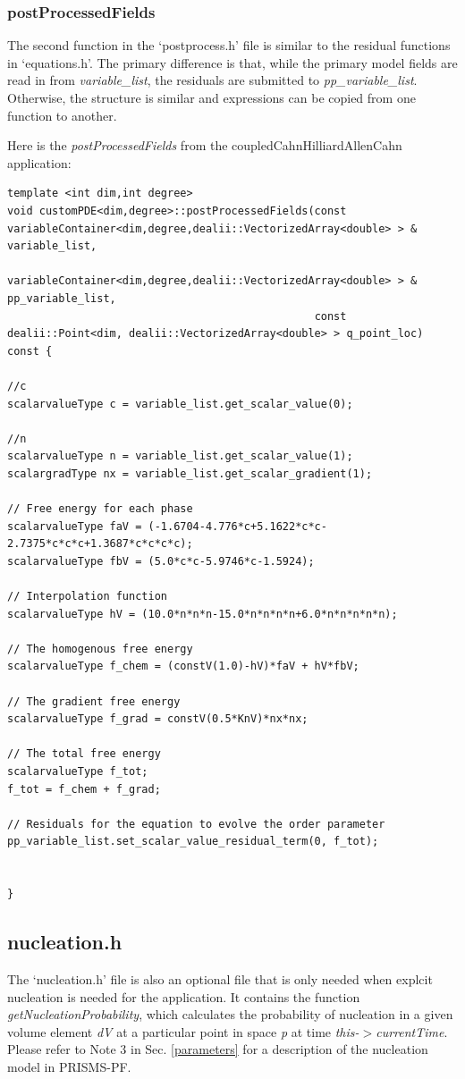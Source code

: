 \documentclass[10pt]{article} %
\begin{document}
\subsubsection{postProcessedFields}
The second function in the `postprocess.h' file is similar to the residual functions in `equations.h'. The primary difference is that, while the primary model fields are read in from \emph{variable\_list}, the residuals are submitted to \emph{pp\_variable\_list}. Otherwise, the structure is similar and expressions can be copied from one function to another.

Here is the \emph{postProcessedFields} from the coupledCahnHilliardAllenCahn application:
\scriptsize
\begin{lstlisting}
template <int dim,int degree>
void customPDE<dim,degree>::postProcessedFields(const variableContainer<dim,degree,dealii::VectorizedArray<double> > & variable_list,
				variableContainer<dim,degree,dealii::VectorizedArray<double> > & pp_variable_list,
												const dealii::Point<dim, dealii::VectorizedArray<double> > q_point_loc) const {

//c
scalarvalueType c = variable_list.get_scalar_value(0);

//n
scalarvalueType n = variable_list.get_scalar_value(1);
scalargradType nx = variable_list.get_scalar_gradient(1);

// Free energy for each phase
scalarvalueType faV = (-1.6704-4.776*c+5.1622*c*c-2.7375*c*c*c+1.3687*c*c*c*c);
scalarvalueType fbV = (5.0*c*c-5.9746*c-1.5924);

// Interpolation function
scalarvalueType hV = (10.0*n*n*n-15.0*n*n*n*n+6.0*n*n*n*n*n);

// The homogenous free energy
scalarvalueType f_chem = (constV(1.0)-hV)*faV + hV*fbV;

// The gradient free energy
scalarvalueType f_grad = constV(0.5*KnV)*nx*nx;

// The total free energy
scalarvalueType f_tot;
f_tot = f_chem + f_grad;

// Residuals for the equation to evolve the order parameter 
pp_variable_list.set_scalar_value_residual_term(0, f_tot);


}
\end{lstlisting}
\normalsize

\subsection{nucleation.h}
The `nucleation.h' file is also an optional file that is only needed when explcit nucleation is needed for the application. It contains the function \emph{getNucleationProbability}, which calculates the probability of nucleation in a given volume element \emph{dV} at a particular point in space \emph{p} at time \emph{this-$>$currentTime}. Please refer to Note 3 in Sec. \ref{parameters} for a description of the nucleation model in PRISMS-PF.
\end{document}
